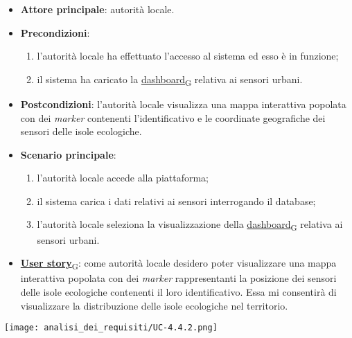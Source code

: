 \begin{itemize}
	\item \textbf{Attore principale}: autorità locale.
	\item \textbf{Precondizioni}:
	      \begin{enumerate}
		      \item l'autorità locale ha effettuato l'accesso al sistema ed esso è in funzione;
		      \item il sistema ha caricato la \href{https://7last.github.io/docs/pb/documentazione-interna/glossario\#dashboard}{dashboard\textsubscript{G}} relativa ai sensori urbani.
	      \end{enumerate}
	\item \textbf{Postcondizioni}: l'autorità locale visualizza una mappa interattiva popolata con dei \textit{marker} contenenti l'identificativo e le coordinate geografiche dei sensori delle isole ecologiche.
	\item \textbf{Scenario principale}:
	      \begin{enumerate}
		      \item l'autorità locale accede alla piattaforma;
		      \item il sistema carica i dati relativi ai sensori interrogando il database;
		      \item l'autorità locale seleziona la visualizzazione della \href{https://7last.github.io/docs/pb/documentazione-interna/glossario\#dashboard}{dashboard\textsubscript{G}} relativa ai sensori urbani.
	      \end{enumerate}
	\item \href{https://7last.github.io/docs/pb/documentazione-interna/glossario\#user-story}{\textbf{User story}\textsubscript{G}}:
	      come autorità locale desidero poter visualizzare una mappa interattiva popolata con dei \textit{marker} rappresentanti la posizione dei sensori delle isole ecologiche
	      contenenti il loro identificativo. Essa mi consentirà di visualizzare la distribuzione delle isole ecologiche nel territorio.
\end{itemize}
\begin{center}
	\texttt{[image: analisi\_dei\_requisiti/UC-4.4.2.png]}
\end{center}


